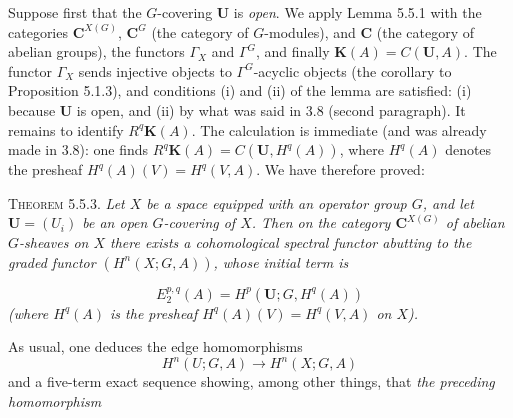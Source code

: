 Suppose first that the $G$-covering ${\mathbf U}$ is \textit{open}. We apply Lemma 5.5.1
with the categories ${\mathbf C}^{X(G)}$, ${\mathbf C}^G$ (the category of $G$-modules), and ${\mathbf C}$
(the category of abelian groups), the functors $\Gamma_X$ and $\Gamma^G$, and
finally $\mathbf K(A)=C({\mathbf U},A)$. The functor $\Gamma_X$ sends injective
objects to $\Gamma^G$-acyclic objects (the corollary to Proposition 5.1.3), and
conditions (i) and (ii) of the lemma are satisfied: (i) because ${\mathbf U}$ is
open, and (ii) by what was said in 3.8 (second paragraph). It remains to
identify $R^q\mathbf K(A)$. The calculation is immediate (and was already made
in 3.8): one finds $R^q\mathbf K(A)=C({\mathbf U},H^q(A))$, where $H^q(A)$
denotes the presheaf $H^q(A)(V)=H^q(V,A)$. We have therefore proved:

\textsc{Theorem 5.5.3.} \textit{Let $X$ be a space equipped with an
operator group $G$, and let ${\mathbf U}=(U_i)$ be an open $G$-covering of $X$.
Then on the category ${\mathbf C}^{X(G)}$ of abelian $G$-sheaves on $X$ there exists a
cohomological spectral functor abutting to the graded functor
$(H^n(X;G,A))$, whose initial term is}

\[
\tag{5.5.4}
E_2^{p,q}(A)=H^p({\mathbf U};G,H^q(A))
\]
\textit{(where $H^q(A)$ is the presheaf $H^q(A)(V)=H^q(V,A)$ on $X$).}

As usual, one deduces the edge homomorphisms
\[
\tag{5.5.5}
H^n(U;G,A)\to H^n(X;G,A)
\]
and a five-term exact sequence showing, among other things, that \textit{the preceding homomorphism}

